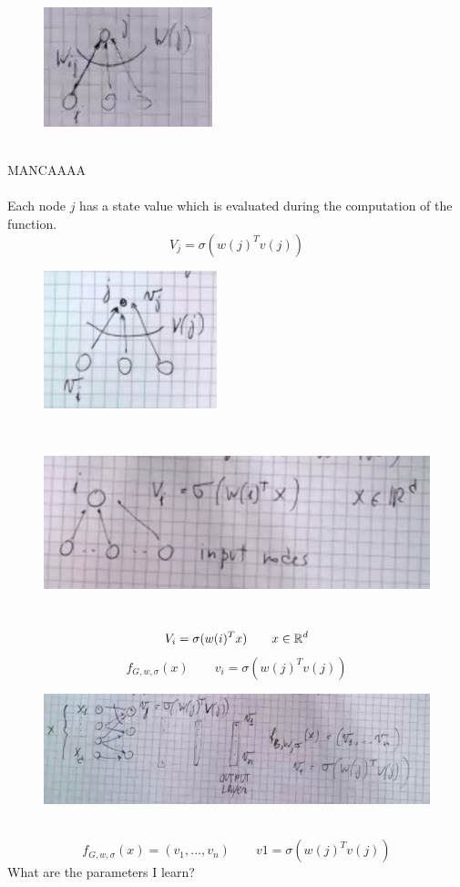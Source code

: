 \documentclass[../main.tex]{subfiles}
\begin{document}
\begin{figure}[h]
    \centering
    \includegraphics[width=0.3\linewidth]{../img/lez24-img3.JPG}
    \caption{}
\end{figure}\\
MANCAAAA
\\\\
Each node $j$ has a state value which is evaluated during the computation of the function.
$$
V_j = \sigma(w(j)^T v(j))
$$
\begin{figure}[h]
    \centering
    \includegraphics[width=0.3\linewidth]{../img/lez24-img4.JPG}
    \caption{}
\end{figure}\\
\begin{figure}[h]
    \centering
    \includegraphics[width=0.3\linewidth]{../img/lez24-img5.JPG}
    \caption{}
\end{figure}\\
\newpage
$$
V_i = \sigma(w(i)^T x) \qquad x \in \mathbb{R}^d
$$
$$
f_{G,w,\sigma}(x) \qquad v_i = \sigma(w(j)^T v(j))
$$
\begin{figure}[h]
    \centering
    \includegraphics[width=0.5\linewidth]{../img/lez24-img6.JPG}
    \caption{}
\end{figure}\\
$$
f_{G,w,\sigma} (x) = (v_1,...,v_n) \qquad v1= \sigma (w(j)^T v(j))
$$
What are the parameters I learn?\\
\end{document}
